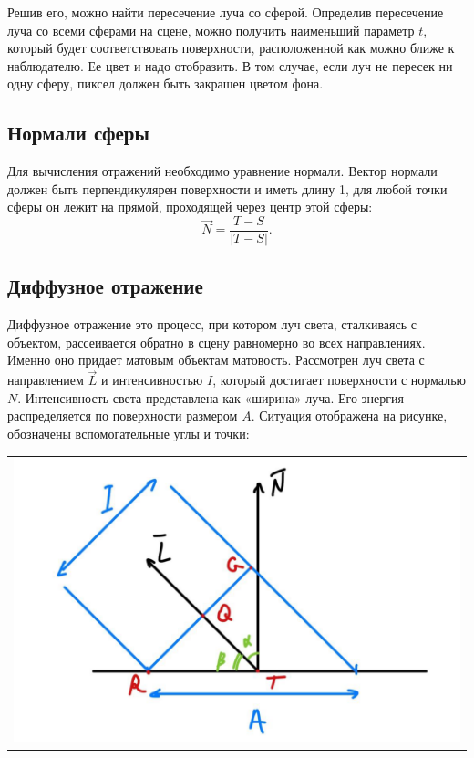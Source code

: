 Решив его, можно найти пересечение луча со сферой. Определив пересечение луча со всеми сферами на сцене, можно получить наименьший параметр $t$, который будет соответствовать поверхности, расположенной как можно ближе к наблюдателю. Ее цвет и надо отобразить. В том случае, если луч не пересек ни одну сферу, пиксел должен быть закрашен цветом фона.

\subsection{Нормали сферы}

Для вычисления отражений необходимо уравнение нормали. Вектор нормали должен быть перпендикулярен поверхности и иметь длину 1, для любой точки сферы он лежит на прямой, проходящей через центр этой сферы:
\begin{equation}
	\vec{N}=\frac{T-S}{|T-S|}.
\end{equation}

\subsection{Диффузное отражение}

Диффузное отражение это процесс, при котором луч света, сталкиваясь с объектом, рассеивается обратно в сцену равномерно во всех направлениях. Именно оно придает матовым объектам матовость.
Рассмотрен луч света с направлением $\vec{L}$ и интенсивностью $I$, который достигает поверхности с нормалью $N$. Интенсивность света представлена как «ширина» луча. Его энергия распределяется по поверхности размером $A$. Ситуация отображена на рисунке, обозначены вспомогательные углы и точки:

\begin{table}[H]
	\centering
	\begin{tabular}{p{1\linewidth}}
		\centering
		\includegraphics[height=0.4\linewidth]{include/2-1.png}
		\captionof{figure}{Диффузное отражение света}
		\label{img:2-1}
	\end{tabular}
\end{table}

